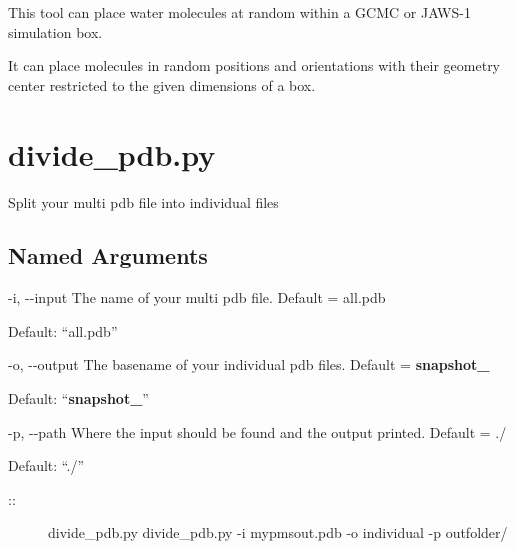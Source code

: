\documentclass[letterpaper,10pt,english]{sphinxmanual}
\begin{document}

This tool can place water molecules at random within a GCMC or JAWS-1 simulation box.

It can place molecules in random positions and orientations with their geometry center restricted to the given dimensions of a box.


\section{divide\_pdb.py}
\label{\detokenize{tools:divide-pdb-py}}

Split your multi pdb file into individual files


%
\begin{sphinxVerbatim}[commandchars=\\\{\}]
  \PYG{p}{[}\PYG{p}{]} \PYG{p}{[} \PYG{p}{]} \PYG{p}{[} \PYG{p}{]} \PYG{p}{[} \PYG{p}{]}
\end{sphinxVerbatim}


\subsection{Named Arguments}
\label{\detokenize{tools:Named Arguments}}\begin{optionlist}{3cm}
\item [-i, -{-}input]  
The name of your multi pdb file. Default = all.pdb

Default: “all.pdb”
\item [-o, -{-}output]  
The basename of your individual pdb files. Default = {\color{red}\bfseries{}snapshot\_}

Default: “{\color{red}\bfseries{}snapshot\_}”
\item [-p, -{-}path]  
Where the input should be found and the output printed. Default = ./

Default: “./”
\end{optionlist}

\begin{description}
\item[{::}] \leavevmode
divide\_pdb.py
divide\_pdb.py -i mypmsout.pdb -o individual -p outfolder/

\end{description}
\end{document}
